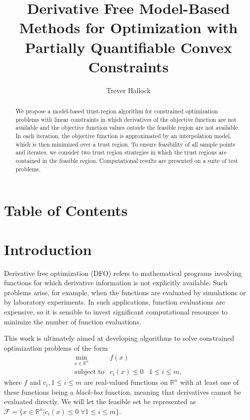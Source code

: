 \documentclass{article}
\title{Derivative Free Model-Based Methods for Optimization with Partially Quantifiable Convex Constraints}
\author{Trever Hallock}
\theoremstyle{case}
\numberwithin{theorem}{subsection}
\newcommand{\domain}{{\mathcal X}}
\newcommand{\feasible}{{\mathcal F}}
\newcommand{\Rn}{\mathbb R^n}
\begin{document}
\maketitle

\begin{abstract}

We propose a model-based trust-region algorithm for constrained optimization problems with linear constraints in which derivatives of the objective function are not available and the objective function values outside the feasible region are not available.
In each iteration, the objective function is approximated by an interpolation model, which is then minimized over a trust region.
To ensure feasibility of all sample points and iterates, we consider two trust region strategies in which the trust regions are contained in the feasible region.
Computational results are presented on a suite of test problems.

\end{abstract}

\newpage

\section{Table of Contents}

\tableofcontents

\newpage


\section{Introduction}

Derivative free optimization (DFO) refers to mathematical programs involving functions for which derivative information is not explicitly available.
Such problems arise, for example, when the functions are evaluated by simulations or by laboratory experiments.
In such applications, function evaluations are expensive, so it is sensible to invest significant computational resources to minimize the number of function evaluations.

This work is ultimately aimed at developing algorithms to solve constrained optimization problems of the form 
\[ \begin{array}{ccl} \min_{x \in \Rn} & f(x) \\
\mbox{subject to} & c_i(x) \le 0 & 1 \le i \le m,
\end{array}
\]
where 
$f$ and $c_i, 1 \le i \le m$ are real-valued functions on $\Rn$ with at least one of these functions being a {\em black-box} function, meaning that derivatives cannot be evaluated directly.
We will let the feasible set be represented as $\feasible = \{x \in \Rn | c_i(x) \le 0 \; \forall 1 \le i \le m \}$.
\end{document}

